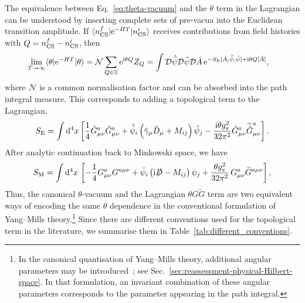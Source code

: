 \documentclass[review]{elsarticle}
\numberwithin{equation}{section}
\numberwithin{table}{section}
\numberwithin{figure}{section}
\def\d{\mathrm{d}}
\def\D{\mathcal{D}}
\def\N{\mathcal{N}}
\def\i{\mathrm{i}}
\def\e{\mathrm{e}}
\begin{document}
The equivalence between Eq.~\eqref{eq:theta-vacuum} and the $\theta$ term in the Lagrangian can be understood by inserting complete sets of pre-vacua into the Euclidean transition amplitude. If $\langle n^f_{\rm CS}|\e^{-HT}|n^i_{\rm CS}\rangle$ receives contributions from field histories with $Q=n^f_{\rm CS}-n^i_{\rm CS}$, then
\begin{align}
    \lim_{T\to\infty}\langle\theta|\e^{-HT}|\theta\rangle 
    &=\N \sum_{Q\in\mathbb{Z}}\e^{\i\theta Q}Z_Q 
    = \int \D \hat{\bar\psi}\D\hat\psi \D \hat{A} \,\e^{-S_{\rm E}[\hat{A},\hat{\bar\psi},\hat\psi]+\i\theta Q[\hat{A}]},
\end{align}
where $\N$ is a common normalisation factor and can be absorbed into the path integral measure. This corresponds to adding a topological term to the Lagrangian,
\begin{align}
    S_{\rm E} = \int\d^4x\left[\frac{1}{4}\hat{G}^a_{\mu\nu}\hat{G}^a_{\mu\nu} 
    + \hat{\bar{\psi}}_i\left(\hat{\gamma}_\mu\hat{D}_\mu+M_{ij}\right)\hat{\psi}_j 
    -\frac{\i\theta g_s^2}{32\pi^2} \hat{G}^a_{\mu\nu}\widetilde{\hat{G}}^a_{\mu\nu}\right].
    \label{eq:Euclidean-action-full}
\end{align}
After analytic continuation back to Minkowski space, we have
\begin{align}
    S_{\rm M} = \int\d^4x\, \left[-\frac{1}{4}G^a_{\mu\nu}G^{a\mu\nu } + \bar{\psi}_i\left(\i\slashed{D}-M_{ij}\right)\psi_j +\frac{\theta g_s^2}{32\pi^2}\, G^a_{\mu\nu}\widetilde{G}^{a\mu\nu}\right],
    \label{eq:SM2}
\end{align}
Thus, the canonical $\theta$-vacuum and the Lagrangian $\theta G\widetilde{G}$ term are two equivalent ways of encoding the same $\theta$ dependence in the conventional formulation of Yang--Mills theory.\footnote{In the canonical quantisation of Yang--Mills theory, additional angular parameters may be introduced~\cite{Ai:2024vfa}; see Sec.~\ref{sec:reassessment-physical-Hilbert-space}. In that formulation, an invariant combination of these angular parameters corresponds to the parameter appearing in the path integral.} Since there are different conventions used for the topological term in the literature, we summarise them in Table~\ref{tab:different_conventions}.
\end{document}
